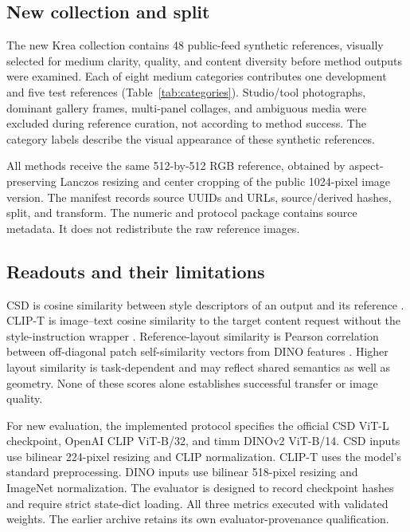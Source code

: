 \subsection{New collection and split}
The new Krea collection contains 48 public-feed synthetic references,
visually selected for medium clarity, quality, and content diversity before
method outputs were examined. Each of eight medium categories contributes
one development and five test references (Table~\ref{tab:categories}).
Studio/tool photographs, dominant gallery frames, multi-panel collages,
and ambiguous media were excluded during reference curation, not according
to method success. The category labels describe the visual appearance of these synthetic
references.

\begin{table}[t]
\centering\small
\caption{New synthetic-reference split, distinct from the archived 40 IDs.}
\label{tab:categories}

\end{table}

All methods receive the same 512-by-512 RGB reference, obtained by
aspect-preserving Lanczos resizing and center cropping of the public
1024-pixel image version. The manifest records source UUIDs and URLs,
source/derived hashes, split, and transform. The numeric and protocol package contains source metadata. It does not
redistribute the raw reference images.

\subsection{Readouts and their limitations}
CSD is cosine similarity between style descriptors of an output and its
reference \citep{somepalli2024csd}. CLIP-T is image--text cosine similarity
to the target content request without the style-instruction wrapper
\citep{radford2021clip}. Reference-layout similarity is Pearson correlation
between off-diagonal patch self-similarity vectors from DINO features
\citep{oquab2024dinov2}. Higher layout similarity is task-dependent and may
reflect shared semantics as well as geometry. None of these scores alone
establishes successful transfer or image quality.

For new evaluation, the implemented protocol specifies the official CSD
ViT-L checkpoint, OpenAI CLIP ViT-B/32, and timm DINOv2 ViT-B/14.
CSD inputs use bilinear 224-pixel resizing and CLIP normalization. CLIP-T
uses the model's standard preprocessing. DINO inputs use bilinear
518-pixel resizing and ImageNet normalization. The evaluator is designed to
record checkpoint hashes and require strict state-dict loading. All three
metrics executed with validated weights. The earlier archive retains its
own evaluator-provenance qualification.

